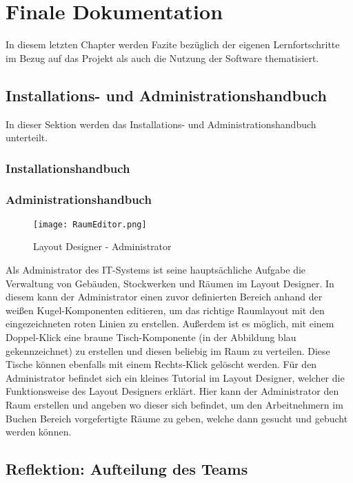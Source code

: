 \chapter{Finale Dokumentation}

In diesem letzten Chapter werden Fazite bezüglich der eigenen Lernfortschritte im Bezug auf das Projekt als auch die Nutzung der Software thematisiert.

\section{Installations- und Administrationshandbuch}

In dieser Sektion werden das Installations- und Administrationshandbuch unterteilt.
\subsection{Installationshandbuch}


\subsection{Administrationshandbuch}

\begin{figure}[!h]
    \centering
    \texttt{[image: RaumEditor.png]}
    \caption{Layout Designer - Administrator}
    \label{fig:LayoutDesigner}
\end{figure}

Als Administrator des IT-Systems ist seine hauptsächliche Aufgabe die Verwaltung von Gebäuden, Stockwerken und Räumen im Layout Designer.
In diesem kann der Administrator einen zuvor definierten Bereich anhand der weißen Kugel-Komponenten editieren, um das richtige Raumlayout mit den eingezeichneten roten Linien zu erstellen.
Außerdem ist es möglich, mit einem Doppel-Klick eine braune Tisch-Komponente (in der Abbildung blau gekennzeichnet) zu erstellen und diesen beliebig im Raum zu verteilen.
Diese Tische können ebenfalls mit einem Rechts-Klick gelöscht werden.
Für den Administrator befindet sich ein kleines Tutorial im Layout Designer, welcher die Funktionsweise des Layout Designers erklärt.
Hier kann der Administrator den Raum erstellen und angeben wo dieser sich befindet, um den Arbeitnehmern im Buchen Bereich vorgefertigte Räume zu geben, welche dann gesucht und gebucht werden können.

\pagebreak

\section{Reflektion: Aufteilung des Teams}

